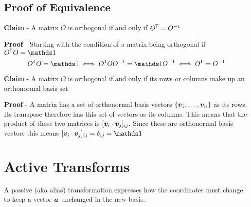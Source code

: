 \documentclass{article}
\begin{document}
    \subsection{Proof of Equivalence}
    \textbf{Claim} - A matrix \(O\) is orthogonal if and only if \(O^{\mkern-1.5mu\mathsf{T}} = O^{-1}\)
    
    \textbf{Proof} - Starting with the condition of a matrix being orthogonal if \(O\trans O = \ident\)
    \[O\trans O = \ident \iff O\trans OO^{-1} = \ident O^{-1} \iff O\trans = O^{-1}\]
    
    \textbf{Claim} - A matrix \(O\) is orthogonal if and only if its rows or columns make up an orthonormal basis set
    
    \textbf{Proof} - A matrix has a set of orthonormal basis vectors \(\{\bm{v}_1,\dotsc,\bm{v}_n\}\) as its rows. 
    Its transpose therefore has this set of vectors as its columns. 
    This means that the product of these two matrices is \([\bm{v}_i\cdot\bm{v}_j]_{ij}\). 
    Since these are orthonormal basis vectors this means \([\vv v_i \cdot\vv v_j]_{ij} = \delta_{ij} = \ident \)
    
    \section{Active Transforms}
    A passive (aka alias) transformation expresses how the coordinates must change to keep a vector \(\bm{a}\) unchanged in the new basis.
    
\end{document}
